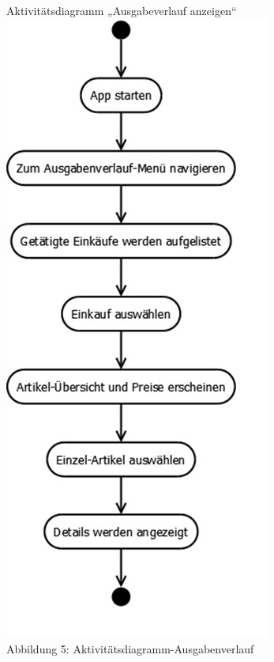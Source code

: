 \documentclass[12pt,a4paper]{article}
\begin{document}
\\
\newpage
Aktivitätsdiagramm „Ausgabeverlauf anzeigen“
\\
\includegraphics[scale=0.6, origin=l]{Aktivitaets-Diagramm-Ausgabenverlauf.png}
\\
\footnotesize Abbildung 5: Aktivitätsdiagramm-Ausgabenverlauf
\normalsize
\\
\linebreak
\end{document}
